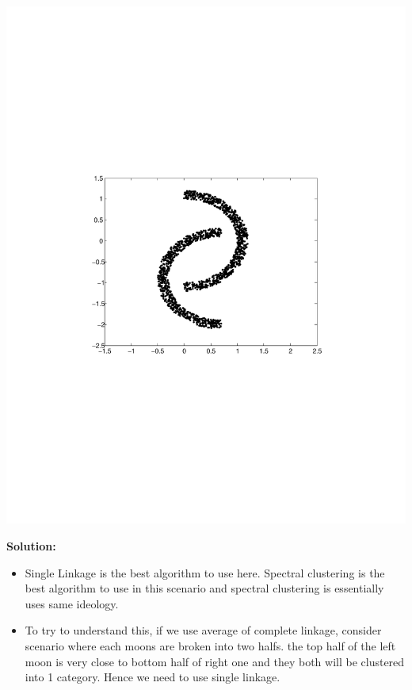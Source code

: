 \documentclass[twoside,10pt]{article}
\begin{document}
\includegraphics[trim = 0mm 90mm 0mm 90mm, clip, width = \linewidth]{clustering}

\textbf{Solution:}
\begin{itemize}
\item Single Linkage is the best algorithm to use here. Spectral clustering is the best algorithm to use in this scenario and spectral clustering is essentially uses same ideology.
\item To try to understand this, if we use average of complete linkage, consider scenario where each moons are broken into two halfs. the top half of the left moon is very close to bottom half of right one and they both will be clustered into 1 category. Hence we need to use single linkage.
\end{itemize}
\end{document}
